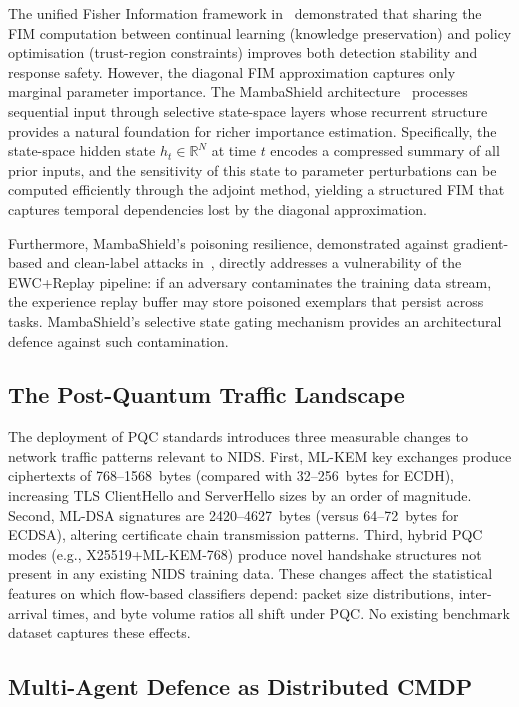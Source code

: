 \documentclass[12pt,a4paper]{article}
\theoremstyle{definition}
\begin{document}
The unified Fisher Information framework in~\cite{anaedevha2026cl_rl} demonstrated that sharing the FIM computation between continual learning (knowledge preservation) and policy optimisation (trust-region constraints) improves both detection stability and response safety. However, the diagonal FIM approximation captures only marginal parameter importance. The MambaShield architecture~\cite{anaedevha2026mambashield} processes sequential input through selective state-space layers whose recurrent structure provides a natural foundation for richer importance estimation. Specifically, the state-space hidden state $h_t \in \mathbb{R}^N$ at time $t$ encodes a compressed summary of all prior inputs, and the sensitivity of this state to parameter perturbations can be computed efficiently through the adjoint method, yielding a structured FIM that captures temporal dependencies lost by the diagonal approximation.

Furthermore, MambaShield's poisoning resilience, demonstrated against gradient-based and clean-label attacks in~\cite{anaedevha2026mambashield}, directly addresses a vulnerability of the EWC+Replay pipeline: if an adversary contaminates the training data stream, the experience replay buffer may store poisoned exemplars that persist across tasks. MambaShield's selective state gating mechanism provides an architectural defence against such contamination.

\subsection{The Post-Quantum Traffic Landscape}

The deployment of PQC standards introduces three measurable changes to network traffic patterns relevant to NIDS. First, ML-KEM key exchanges produce ciphertexts of 768--1568~bytes (compared with 32--256~bytes for ECDH), increasing TLS ClientHello and ServerHello sizes by an order of magnitude. Second, ML-DSA signatures are 2420--4627~bytes (versus 64--72~bytes for ECDSA), altering certificate chain transmission patterns. Third, hybrid PQC modes (e.g., X25519+ML-KEM-768) produce novel handshake structures not present in any existing NIDS training data. These changes affect the statistical features on which flow-based classifiers depend: packet size distributions, inter-arrival times, and byte volume ratios all shift under PQC. No existing benchmark dataset captures these effects.

\subsection{Multi-Agent Defence as Distributed CMDP}
\end{document}
